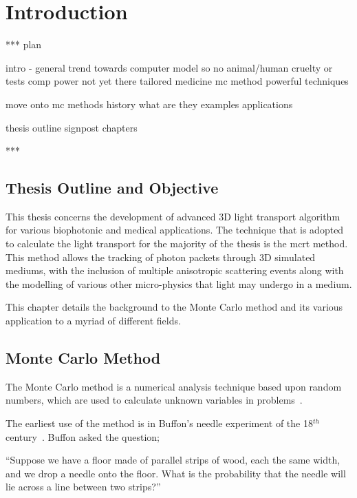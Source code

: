 \chapter{Introduction}


***
plan

intro - general trend towards computer model so no animal/human cruelty or tests
comp power not yet there
tailored medicine
mc method powerful techniques

move onto mc methods
history
what are they
examples
applications

thesis outline
signpost chapters

***

\section{Thesis Outline and Objective}

This thesis concerns the development of advanced 3D light transport algorithm for various biophotonic and medical applications.
The technique that is adopted to calculate the light transport for the majority of the thesis is the \gls*{mcrt} method.
This method allows the tracking of photon packets through 3D simulated mediums, with the inclusion of multiple anisotropic scattering events along with the modelling of various other micro-physics that light may undergo in a medium.


This chapter details the background to the Monte Carlo method and its various application to a myriad of different fields.

\section{Monte Carlo Method}\label{sec:mcmethod}
The Monte Carlo method is a numerical analysis technique based upon random numbers, which are used to calculate unknown variables in problems~\cite{cashwell1959practical,rogers1990monte}. 

The earliest use of the method is in Buffon's needle experiment of the 18$^{th}$ century~\cite{badger1994lazzarini,beckmann2015history,buffon1785histoire}. Buffon asked the question;

\medskip

``Suppose we have a floor made of parallel strips of wood, each the same width, and we drop a needle onto the floor. What is the probability that the needle will lie across a line between two strips?''

\medskip

